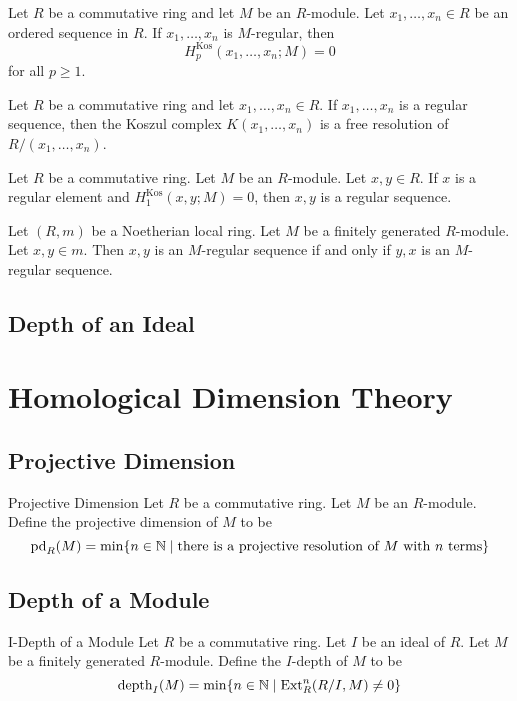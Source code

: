 \documentclass[a4paper]{article}
\begin{document}
\begin{prp}{}{} Let $R$ be a commutative ring and let $M$ be an $R$-module. Let $x_1,\dots,x_n\in R$ be an ordered sequence in $R$. If $x_1,\dots,x_n$ is $M$-regular, then $$H_p^\text{Kos}(x_1,\dots,x_n;M)=0$$ for all $p\geq 1$. 
\end{prp}

\begin{crl}{}{} Let $R$ be a commutative ring and let $x_1,\dots,x_n\in R$. If $x_1,\dots,x_n$ is a regular sequence, then the Koszul complex $K(x_1,\dots,x_n)$ is a free resolution of $R/(x_1,\dots,x_n)$. 
\end{crl}

\begin{prp}{}{} Let $R$ be a commutative ring. Let $M$ be an $R$-module. Let $x,y\in R$. If $x$ is a regular element and $H_1^\text{Kos}(x,y;M)=0$, then $x,y$ is a regular sequence. 
\end{prp}

\begin{prp}{}{} Let $(R,m)$ be a Noetherian local ring. Let $M$ be a finitely generated $R$-module. Let $x,y\in m$. Then $x,y$ is an $M$-regular sequence if and only if $y,x$ is an $M$-regular sequence. 
\end{prp}

\subsection{Depth of an Ideal}

\pagebreak
\section{Homological Dimension Theory}
\subsection{Projective Dimension}
\begin{defn}{Projective Dimension}{} Let $R$ be a commutative ring. Let $M$ be an $R$-module. Define the projective dimension of $M$ to be $$\text{pd}_R(M)=\min\{n\in\mathbb{N}\;|\;\text{there is a projective resolution of }M\text{ with }n\text{ terms}\}$$
\end{defn}

\subsection{Depth of a Module}
\begin{defn}{I-Depth of a Module}{} Let $R$ be a commutative ring. Let $I$ be an ideal of $R$. Let $M$ be a finitely generated $R$-module. Define the $I$-depth of $M$ to be $$\text{depth}_I(M)=\min\{n\in\mathbb{N}\;|\;\text{Ext}_R^n(R/I,M)\neq 0\}$$
\end{defn}
\end{document}
